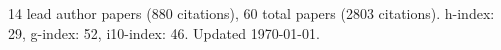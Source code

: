 14 lead author papers (880 citations),
60 total papers (2803 citations).\newline
h-index: 29, g-index: 52, i10-index: 46. Updated \today.
